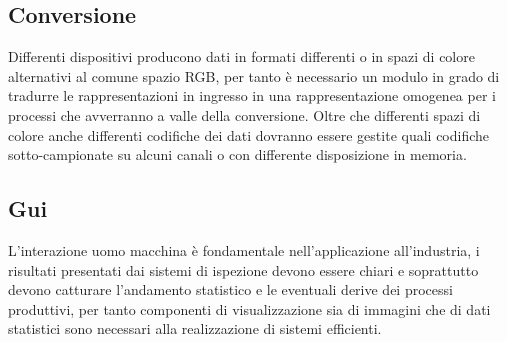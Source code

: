 \subsection{Conversione}
Differenti dispositivi producono dati in formati differenti o  in spazi di colore alternativi al comune spazio RGB, per tanto è necessario un modulo in grado di tradurre le rappresentazioni in ingresso in una rappresentazione omogenea per i processi che avverranno a valle della conversione. Oltre che differenti spazi di colore anche differenti codifiche dei dati dovranno essere gestite quali codifiche sotto-campionate su alcuni canali o con differente disposizione in memoria.

\subsection{Gui}
L'interazione uomo macchina è fondamentale nell'applicazione all'industria, i risultati presentati dai sistemi di ispezione devono essere chiari e soprattutto devono catturare l'andamento statistico e le eventuali derive dei processi produttivi, per tanto componenti di visualizzazione sia di immagini che di dati statistici sono necessari alla realizzazione di sistemi efficienti.